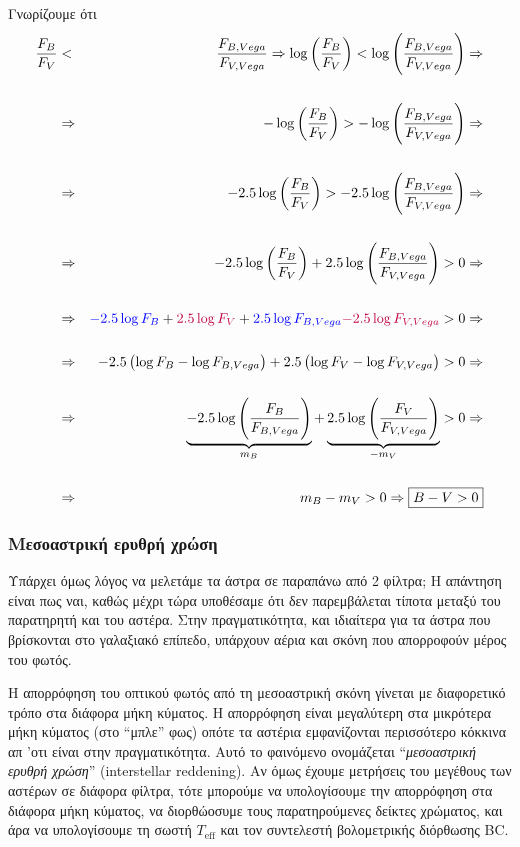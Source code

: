 Γνωρίζουμε ότι 
\begin{eqnarray*}
\frac{F_B}{F_V} &<& \frac{F_{B,Vega}}{F_{V,Vega}} \Rightarrow \log \left( \frac{F_B}{F_V} \right) < \log \left( \frac{F_{B,Vega}}{F_{V,Vega}} \right) \Rightarrow \\\\\
&\Rightarrow & - \log \left( \frac{F_B}{F_V} \right) > - \log \left( \frac{F_{B,Vega}}{F_{V,Vega}} \right) \Rightarrow \\\\
&\Rightarrow & - 2.5 \log \left( \frac{F_B}{F_V} \right) > - 2.5 \log \left( \frac{F_{B,Vega}}{F_{V,Vega}} \right) \Rightarrow \\\\
&\Rightarrow & - 2.5 \log \left( \frac{F_B}{F_V} \right) + 2.5 \log \left( \frac{F_{B,Vega}}{F_{V,Vega}} \right) > 0 \Rightarrow \\\\
&\Rightarrow & {\color{blue} -2.5 \log F_B} + {\color{purple} 2.5 \log F_V} + {\color{blue} 2.5 \log F_{B,Vega}} {\color{purple} - 2.5 \log F_{V,Vega}} > 0 \Rightarrow \\\\
&\Rightarrow & -2.5 \left( \log F_B - \log F_{B,Vega} \right) + 2.5 \left( \log F_V - \log F_{V,Vega} \right) > 0 \Rightarrow \\\\
&\Rightarrow & \underbrace{-2.5 \log \left( \frac{F_B}{F_{B,Vega}} \right)}_{m_B} + \underbrace{2.5 \log \left( \frac{F_V}{F_{V,Vega}} \right)}_{- m_V} > 0 \Rightarrow \\\\
&\Rightarrow & m_B - m_V > 0 \Rightarrow \boxed{B - V > 0}
\end{eqnarray*}
\subsubsection{Μεσοαστρική ερυθρή χρώση}
Υπάρχει όμως λόγος να μελετάμε τα άστρα σε παραπάνω από 2 φίλτρα; Η απάντηση είναι πως ναι, καθώς μέχρι τώρα υποθέσαμε ότι δεν παρεμβάλεται τίποτα μεταξύ του παρατηρητή και του αστέρα. Στην πραγματικότητα, και ιδιαίτερα για τα άστρα που βρίσκονται στο γαλαξιακό επίπεδο, υπάρχουν αέρια και σκόνη που απορροφούν μέρος του φωτός.

Η απορρόφηση του οπτικού φωτός από τη μεσοαστρική σκόνη γίνεται με διαφορετικό τρόπο στα διάφορα μήκη κύματος. Η απορρόφηση είναι μεγαλύτερη στα μικρότερα μήκη κύματος (στο ``μπλε'' φως) οπότε τα αστέρια εμφανίζονται περισσότερο κόκκινα απ 'οτι είναι στην πραγματικότητα. Αυτό το φαινόμενο ονομάζεται ``\textit{μεσοαστρική ερυθρή χρώση}'' (interstellar reddening). Αν όμως έχουμε μετρήσεις του μεγέθους των αστέρων σε διάφορα φίλτρα, τότε μπορούμε να υπολογίσουμε την απορρόφηση στα διάφορα μήκη κύματος, να διορθώοσυμε τους παρατηρούμενες δείκτες χρώματος, και άρα να υπολογίσουμε τη σωστή $T_{\text{eff}}$ και τον συντελεστή βολομετρικής διόρθωσης BC.



